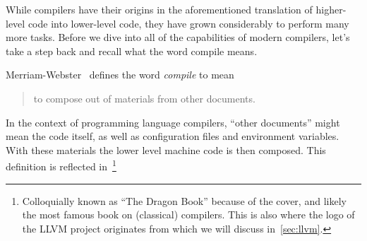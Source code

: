 While compilers have their origins in the aforementioned translation of higher-level code into lower-level code, they have grown considerably to perform many more tasks.
Before we dive into all of the capabilities of modern compilers, let's take a step back and recall what the word compile means.

Merriam-Webster~\cite{compiledef} defines the word \emph{compile} to mean
\begin{quote}
    to compose out of materials from other documents.
\end{quote}
In the context of programming language compilers,  ``other documents'' might mean the code itself, as well as configuration files and environment variables.
With these materials the lower level machine code is then composed.
This definition is reflected in~\footnote{Colloquially known as ``The Dragon Book'' because of the cover, and likely the most famous book on (classical) compilers. This is also where the logo of the LLVM project originates from which we will discuss in~\cref{sec:llvm}.}
